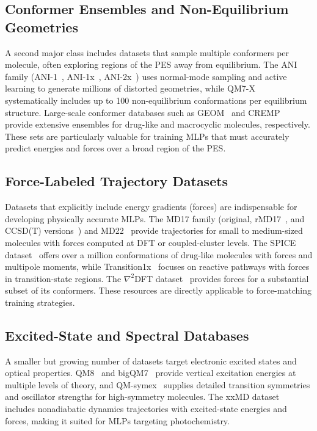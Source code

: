 \documentclass[12pt]{article}
\begin{document}
\subsection*{Conformer Ensembles and Non-Equilibrium Geometries}
A second major class includes datasets that sample multiple conformers per molecule, often exploring regions of the PES away from equilibrium. The ANI family (ANI-1~\cite{ds25-7}, ANI-1x~\cite{ds26-3}, ANI-2x~\cite{ds27-8}) uses normal-mode sampling and active learning to generate millions of distorted geometries, while QM7-X~\cite{ds6-33} systematically includes up to 100 non-equilibrium conformations per equilibrium structure. Large-scale conformer databases such as GEOM~\cite{ds34-16} and CREMP~\cite{ds33-15} provide extensive ensembles for drug-like and macrocyclic molecules, respectively. These sets are particularly valuable for training MLPs that must accurately predict energies and forces over a broad region of the PES.

\subsection*{Force-Labeled Trajectory Datasets}
Datasets that explicitly include energy gradients (forces) are indispensable for developing physically accurate MLPs. The MD17 family (original, rMD17~\cite{ds20-18,ds20-19}, and CCSD(T) versions~\cite{ds20-20}) and MD22~\cite{ds22-21} provide trajectories for small to medium-sized molecules with forces computed at DFT or coupled-cluster levels. The SPICE dataset~\cite{ds12-43} offers over a million conformations of drug-like molecules with forces and multipole moments, while Transition1x~\cite{ds28-47} focuses on reactive pathways with forces in transition-state regions. The $\nabla^2$DFT dataset~\cite{ds31-23} provides forces for a substantial subset of its conformers. These resources are directly applicable to force-matching training strategies.

\subsection*{Excited-State and Spectral Databases}
A smaller but growing number of datasets target electronic excited states and optical properties. QM8~\cite{ds9-35} and bigQM7~\cite{ds17-9} provide vertical excitation energies at multiple levels of theory, and QM-symex~\cite{ds30-39} supplies detailed transition symmetries and oscillator strengths for high-symmetry molecules. The xxMD dataset~\cite{ds21-51} includes nonadiabatic dynamics trajectories with excited-state energies and forces, making it suited for MLPs targeting photochemistry.
\end{document}
